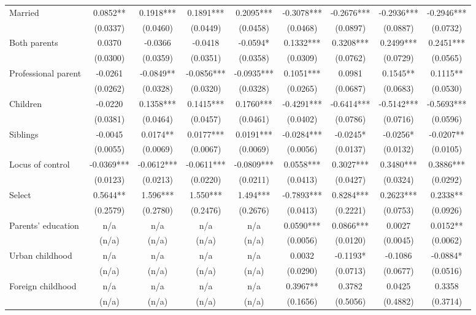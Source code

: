 \documentclass[12pt]{report}
\begin{document}
\begin{sidewaystable}
\begin{tabular}{lc|c|c|c|c|c|c|c}
Married & 0.0852** & 0.1918*** & 0.1891*** & 0.2095*** & -0.3078*** & -0.2676*** & -0.2936*** & -0.2946***\\
& (0.0337) & (0.0460) & (0.0449) & (0.0458) & (0.0468) & (0.0897) & (0.0887) & (0.0732)\\
Both parents & 0.0370 & -0.0366 & -0.0418 & -0.0594* & 0.1332*** & 0.3208*** & 0.2499*** & 0.2451***\\
& (0.0300) & (0.0359) & (0.0351) & (0.0358) & (0.0309) & (0.0762) & (0.0729) & (0.0565)\\
Professional parent & -0.0261 & -0.0849** & -0.0856*** & -0.0935*** & 0.1051*** & 0.0981 & 0.1545** & 0.1115**\\
& (0.0262) & (0.0328) & (0.0320) & (0.0328) & (0.0265) & (0.0687) & (0.0683) & (0.0530)\\
Children & -0.0220 & 0.1358*** & 0.1415*** & 0.1760*** & -0.4291*** & -0.6414*** & -0.5142*** & -0.5693***\\
& (0.0381) & (0.0464) & (0.0457) & (0.0461) & (0.0402) & (0.0786) & (0.0716) & (0.0596)\\
Siblings & -0.0045 & 0.0174** & 0.0177*** & 0.0191*** & -0.0284*** & -0.0245* & -0.0256* & -0.0207**\\
& (0.0055) & (0.0069) & (0.0067) & (0.0069) & (0.0056) & (0.0137) & (0.0132) & (0.0105)\\
Locus of control & -0.0369*** & -0.0612*** & -0.0611*** & -0.0809*** & 0.0558*** & 0.3027*** & 0.3480*** & 0.3886***\\
& (0.0123) & (0.0213) & (0.0220) & (0.0211) & (0.0413) & (0.0427) & (0.0324) & (0.0292)\\
Select & 0.5644** & 1.596*** & 1.550*** & 1.494*** & -0.7893*** & 0.8284*** & 0.2623*** & 0.2338**\\
& (0.2579) & (0.2780) & (0.2476) & (0.2676) & (0.0413) & (0.2221) & (0.0753) & (0.0926)\\
Parents' education & n/a & n/a & n/a & n/a & 0.0590*** & 0.0866*** & 0.0027 & 0.0152**\\
& (n/a) & (n/a) & (n/a) & (n/a) & (0.0056) & (0.0120) & (0.0045) & (0.0062)\\
Urban childhood & n/a & n/a & n/a & n/a & 0.0032 & -0.1193* & -0.1086 & -0.0884*\\
& (n/a) & (n/a) & (n/a) & (n/a) & (0.0290) & (0.0713) & (0.0677) & (0.0516)\\
Foreign childhood & n/a & n/a & n/a & n/a & 0.3967** & 0.3782 & 0.0425 & 0.3358\\
& (n/a) & (n/a) & (n/a) & (n/a) & (0.1656) & (0.5056) & (0.4882) & (0.3714)\\

\end{tabular}
\end{sidewaystable}
\end{document}
